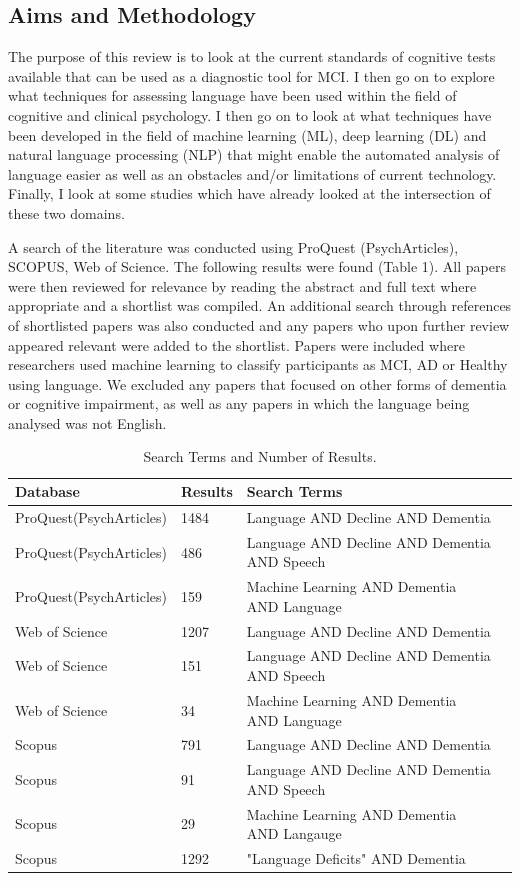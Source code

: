 \documentclass[10pt, letterpaper, twoside, openany]{book}
\begin{document}
\subsection{Aims and Methodology}
\par
The purpose of this review is to look at the current standards of cognitive tests available that can be used as a diagnostic tool for MCI. I then go on to explore what techniques for assessing language have been used within the field of cognitive and clinical psychology. I then go on to look at what techniques have been developed in the field of machine learning (ML), deep learning (DL) and natural language processing (NLP) that might enable the automated analysis of language easier as well as an obstacles and/or limitations of current technology. Finally, I look at some studies which have already looked at the intersection of these two domains. \newline
\par
A search of the literature was conducted using ProQuest (PsychArticles), SCOPUS, Web of Science. The following results were found (Table 1). All papers were then reviewed for relevance by reading the abstract and full text where appropriate and a shortlist was compiled. An additional search through references of shortlisted papers was also conducted and any papers who upon further review appeared relevant were added to the shortlist. Papers were included where researchers used machine learning to classify participants as MCI, AD or Healthy using language. We excluded any papers that focused on other forms of dementia or cognitive impairment, as well as any papers in which the language being analysed was not English. 
\begin{table}
	\begin{center}
	\begin{tabular}{ | p{4cm} | p{1cm} | p{6cm} | p{1cm} |}
		\hline
		Database & Results & Search Terms  \\ \hline
		ProQuest(PsychArticles) & 1484 & Language AND Decline AND Dementia \\ \hline
		ProQuest(PsychArticles) & 486  & Language AND Decline AND Dementia AND Speech \\ \hline
		ProQuest(PsychArticles) & 159 & Machine Learning AND Dementia AND Language \\ \hline
		Web of Science & 1207  & Language AND Decline AND Dementia   \\ \hline
		Web of Science & 151  & Language AND Decline AND Dementia AND Speech  \\ \hline
		Web of Science & 34 & Machine Learning AND Dementia AND Language \\ \hline
		Scopus & 791 & Language AND Decline AND Dementia  \\ \hline
		Scopus & 91 & Language AND Decline AND Dementia AND Speech   \\ \hline
		Scopus & 29 & Machine Learning AND Dementia AND Langauge \\ \hline
		Scopus & 1292 & "Language Deficits" AND Dementia \\ \hline
	\end{tabular}
	\end{center}
	\caption{\label{tab:table-name}Search Terms and Number of Results.}
\end{table}
\end{document}
